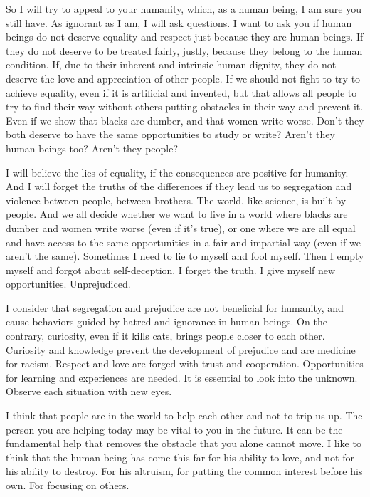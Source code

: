 \documentclass[]{book}
\begin{document}
So I will try to appeal to your humanity, which, as a human being, I am sure you still have. As ignorant as I am, I will ask questions. I want to ask you if human beings do not deserve equality and respect just because they are human beings. If they do not deserve to be treated fairly, justly, because they belong to the human condition. If, due to their inherent and intrinsic human dignity, they do not deserve the love and appreciation of other people. If we should not fight to try to achieve equality, even if it is artificial and invented, but that allows all people to try to find their way without others putting obstacles in their way and prevent it. Even if we show that blacks are dumber, and that women write worse. Don't they both deserve to have the same opportunities to study or write? Aren't they human beings too? Aren't they people?

I will believe the lies of equality, if the consequences are positive for humanity. And I will forget the truths of the differences if they lead us to segregation and violence between people, between brothers. The world, like science, is built by people. And we all decide whether we want to live in a world where blacks are dumber and women write worse (even if it's true), or one where we are all equal and have access to the same opportunities in a fair and impartial way (even if we aren't the same). Sometimes I need to lie to myself and fool myself. Then I empty myself and forgot about self-deception. I forget the truth. I give myself new opportunities. Unprejudiced.

I consider that segregation and prejudice are not beneficial for humanity, and cause behaviors guided by hatred and ignorance in human beings. On the contrary, curiosity, even if it kills cats, brings people closer to each other. Curiosity and knowledge prevent the development of prejudice and are medicine for racism. Respect and love are forged with trust and cooperation. Opportunities for learning and experiences are needed. It is essential to look into the unknown. Observe each situation with new eyes.

I think that people are in the world to help each other and not to trip us up. The person you are helping today may be vital to you in the future. It can be the fundamental help that removes the obstacle that you alone cannot move. I like to think that the human being has come this far for his ability to love, and not for his ability to destroy. For his altruism, for putting the common interest before his own. For focusing on others.
\end{document}
